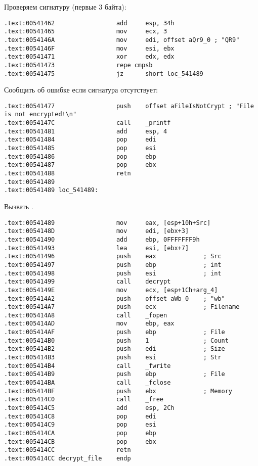 Проверяем сигнатуру (первые 3 байта):

\begin{lstlisting}[style=customasm]
.text:00541462                 add     esp, 34h
.text:00541465                 mov     ecx, 3
.text:0054146A                 mov     edi, offset aQr9_0 ; "QR9"
.text:0054146F                 mov     esi, ebx
.text:00541471                 xor     edx, edx
.text:00541473                 repe cmpsb
.text:00541475                 jz      short loc_541489
\end{lstlisting}

Сообщить об ошибке если сигнатура отсутствует:

\begin{lstlisting}[style=customasm]
.text:00541477                 push    offset aFileIsNotCrypt ; "File is not encrypted!\n"
.text:0054147C                 call    _printf
.text:00541481                 add     esp, 4
.text:00541484                 pop     edi
.text:00541485                 pop     esi
.text:00541486                 pop     ebp
.text:00541487                 pop     ebx
.text:00541488                 retn
.text:00541489
.text:00541489 loc_541489:
\end{lstlisting}

Вызвать .

\begin{lstlisting}[style=customasm]
.text:00541489                 mov     eax, [esp+10h+Src]
.text:0054148D                 mov     edi, [ebx+3]
.text:00541490                 add     ebp, 0FFFFFFF9h
.text:00541493                 lea     esi, [ebx+7]
.text:00541496                 push    eax             ; Src
.text:00541497                 push    ebp             ; int
.text:00541498                 push    esi             ; int
.text:00541499                 call    decrypt
.text:0054149E                 mov     ecx, [esp+1Ch+arg_4]
.text:005414A2                 push    offset aWb_0    ; "wb"
.text:005414A7                 push    ecx             ; Filename
.text:005414A8                 call    _fopen
.text:005414AD                 mov     ebp, eax
.text:005414AF                 push    ebp             ; File
.text:005414B0                 push    1               ; Count
.text:005414B2                 push    edi             ; Size
.text:005414B3                 push    esi             ; Str
.text:005414B4                 call    _fwrite
.text:005414B9                 push    ebp             ; File
.text:005414BA                 call    _fclose
.text:005414BF                 push    ebx             ; Memory
.text:005414C0                 call    _free
.text:005414C5                 add     esp, 2Ch
.text:005414C8                 pop     edi
.text:005414C9                 pop     esi
.text:005414CA                 pop     ebp
.text:005414CB                 pop     ebx
.text:005414CC                 retn
.text:005414CC decrypt_file    endp
\end{lstlisting}

